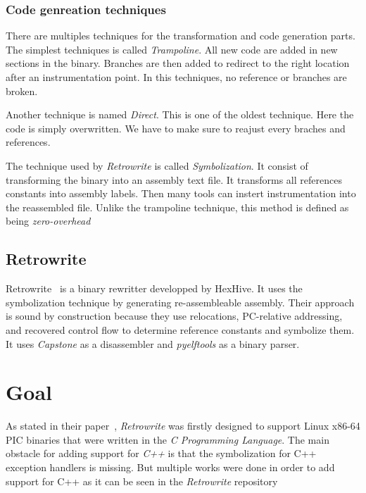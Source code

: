 \documentclass[a4paper,11pt,oneside]{report}
\begin{document}
\subsection{Code genreation techniques}
There are multiples techniques for the transformation and code generation
parts. The simplest techniques is called \textit{Trampoline}. All new code are
added in new sections in the binary. Branches are then added to redirect to the
right location after an instrumentation point. In this techniques, no reference
or branches are broken.

Another technique is named \textit{Direct}. This is one of the oldest
technique. Here the code is simply overwritten. We have to make sure to reajust
every braches and references.


The technique used by \textit{Retrowrite} is called \textit{Symbolization}. It
consist of transforming the binary into an assembly text file. It transforms
all references constants into assembly labels. Then many tools can instert
instrumentation into the reassembled file. Unlike the trampoline technique,
this method is defined as being \textit{zero-overhead}

\section{Retrowrite}
Retrowrite~\cite{dinesh20oakland} is a binary rewritter developped by HexHive. It uses the
symbolization technique by generating re-assembleable assembly. Their approach
is sound by construction because they use relocations, PC-relative addressing,
and recovered control flow to determine reference constants and symbolize them.
It uses \textit{Capstone} as a disassembler and \textit{pyelftools} as a binary parser.


\chapter{Goal}
As stated in their paper~\cite{dinesh20oakland}, \textit{Retrowrite} was
firstly designed to support Linux x86-64 PIC binaries that were written in the
\textit{C Programming Language}.
The main obstacle for adding support for \textit{C++} is that the symbolization
for C++ exception handlers is missing. But multiple works were done in order to
add support for C++ as it can be seen in the \textit{Retrowrite} repository
~\cite{gitCommit}
\end{document}
